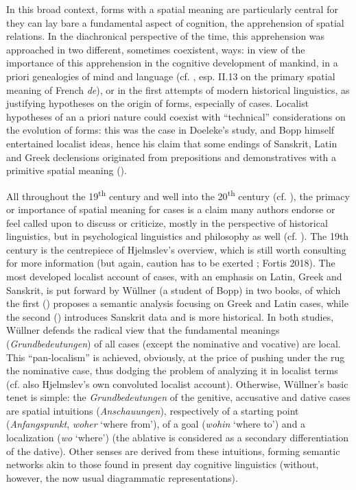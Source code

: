 \documentclass[output=paper]{langscibook}
\begin{document}
In this broad context, forms with a spatial meaning are particularly central for they can lay bare a fundamental aspect of cognition, the apprehension of spatial relations. In the diachronical perspective of the time, this apprehension was approached in two different, sometimes coexistent, ways: in view of the importance of this apprehension in the cognitive development of mankind, in a priori genealogies of mind and language (cf. \citealt{condillac_cours_1775}, esp. II.13 on the primary spatial meaning of French \textit{de}), or in the first attempts of modern historical linguistics, as justifying hypotheses on the origin of forms, especially of cases. Localist hypotheses of an a priori nature could coexist with “technical” considerations on the evolution of forms: this was the case in Doeleke’s study, and Bopp himself entertained localist ideas, hence his claim that some endings of Sanskrit, Latin and Greek declensions originated from prepositions and demonstratives with a primitive spatial meaning (\citeyear{bopp_vergleichende_1826}).

All throughout the 19\textsuperscript{th} century and well into the 20\textsuperscript{th} century (cf. \citealt{kurylowicz_inflectional_1964} ), the primacy or importance of spatial meaning for cases is a claim many authors endorse or feel called upon to discuss or criticize, mostly in the perspective of historical linguistics, but in psychological linguistics and philosophy as well (cf. \citealt{marty_logische_1910}). The 19th century is the centrepiece of Hjelmslev’s overview, which is still worth consulting for more information (but again, caution has to be exerted ; Fortis 2018). The most developed localist account of cases, with an emphasis on Latin, Greek and Sanskrit, is put forward by Wüllner (a student of Bopp) in two books, of which the first (\citealt{wullner_bedeutung_1827}) proposes a semantic analysis focusing on Greek and Latin cases, while the second (\citeyear{wullner_uber_1831}) introduces Sanskrit data and is more historical. In both studies, Wüllner defends the radical view that the fundamental meanings (\textit{Grundbedeutungen}) of all cases (except the nominative and vocative) are local. This “pan-localism” is achieved, obviously, at the price of pushing under the rug the nominative case, thus dodging the problem of analyzing it in localist terms (cf. also Hjelmslev’s own convoluted localist account). Otherwise, Wüllner’s basic tenet is simple: the \textit{Grundbedeutungen} of the genitive, accusative and dative cases are spatial intuitions (\textit{Anschauungen}), respectively of a starting point (\textit{Anfangspunkt}, \textit{woher }‘where from’), of a goal (\textit{wohin }‘where to’) and a localization (\textit{wo }‘where’) (the ablative is considered as a secondary differentiation of the dative). Other senses are derived from these intuitions, forming semantic networks akin to those found in present day cognitive linguistics (without, however, the now usual diagrammatic representations).
\end{document}
